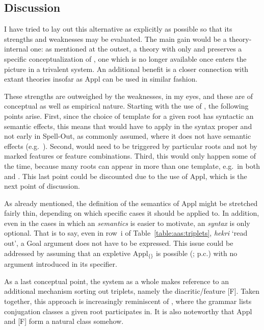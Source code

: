 \begin{exe}
\begin{xlist}
\begin{exe}
\begin{exe}
\begin{xlist}
\begin{exe}
\begin{exe}
\begin{exe}
\begin{exe}
\begin{exe}
\begin{xlist}
\begin{exe}
\begin{exe}
\begin{xlist}
\begin{exe}
\begin{xlist}
\begin{exe}
\begin{xlist}
\begin{exe}
\begin{xlist}
	\subsection{Discussion} \label{aas:jim:cons}
I have tried to lay out this alternative as explicitly as possible so that its strengths and weaknesses may be evaluated. The main gain would be a theory-internal one: as mentioned at the outset, a theory with only {\vds} and {\vzs} preserves a specific conceptualization of , one which is no longer available once  enters the picture in a trivalent system. An additional benefit is a closer connection with extant theories insofar as Appl can be used in similar fashion.

These strengths are outweighed by the weaknesses, in my eyes, and these are of conceptual as well as empirical nature. Starting with the use of , the following points arise. First, since the choice of template for a given root has syntactic an semantic effects, this means that  would have to apply in the syntax proper and not early in Spell-Out, as commonly assumed, where it does not have semantic effects (e.g.~\citealt{harbour03}). Second,  would need to be triggered by particular roots and not by marked features or feature combinations. Third, this would only happen some of the time, because many roots can appear in more than one template, e.g.~in both {\thif} and {\tkal}. This last point could be discounted due to the use of Appl, which is the next point of discussion.

As already mentioned, the definition of the semantics of Appl might be stretched fairly thin, depending on which specific cases it should be applied to. In addition, even in the cases in which an  \emph{semantics} is easier to motivate, an  \emph{syntax} is only optional. That is to say, even in row~i of Table~\ref{table:aas:triplets}, \emph{hekri} `read out', a Goal argument does not have to be expressed. This issue could be addressed by assuming that an expletive Appl$_{\text{\{\}}}$ is possible (\citealt{wood15springer}; p.c.) with no argument introduced in its specifier.

As a last conceptual point, the system as a whole makes reference to an additional mechanism sorting out triplets, namely the diacritic/feature [F]. Taken together, this approach is increasingly reminiscent of \cite{arad05}, where the grammar lists conjugation classes a given root participates in. It is also noteworthy that Appl and [F] form a natural class somehow. 


\end{xlist}
\end{exe}
\end{xlist}
\end{exe}
\end{xlist}
\end{exe}
\end{xlist}
\end{exe}
\end{exe}
\end{xlist}
\end{exe}
\end{exe}
\end{exe}
\end{exe}
\end{exe}
\end{xlist}
\end{exe}
\end{exe}
\end{xlist}
\end{exe}
